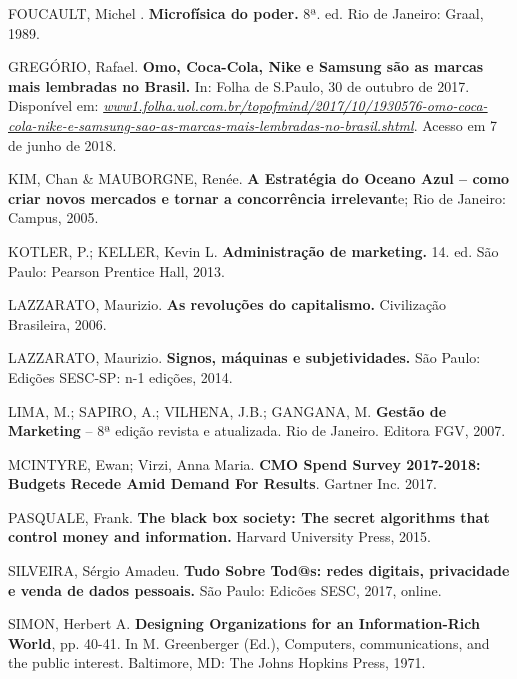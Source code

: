 FOUCAULT, Michel . \textbf{Microfísica do poder.} 8ª. ed. Rio de
Janeiro: Graal, 1989.

GREGÓRIO, Rafael. \textbf{Omo, Coca-Cola, Nike e Samsung são as marcas
mais lembradas no Brasil.} In: Folha de S.Paulo, 30 de outubro de 2017.
Disponível em:
\href{https://www1.folha.uol.com.br/topofmind/2017/10/1930576-omo-coca-cola-nike-e-samsung-sao-as-marcas-mais-lembradas-no-brasil.shtml}{\emph{www1.folha.uol.com.br/topofmind/2017/10/1930576-omo-coca-cola-nike-e-samsung-sao-as-marcas-mais-lembradas-no-brasil.shtml}}.
Acesso em 7 de junho de 2018.

KIM, Chan \& MAUBORGNE, Renée. \textbf{A Estratégia do Oceano Azul --
como criar novos mercados e tornar a concorrência irrelevant}e; Rio de
Janeiro: Campus, 2005.

KOTLER, P.; KELLER, Kevin L. \textbf{Administração de marketing.} 14.
ed. São Paulo: Pearson Prentice Hall, 2013.

LAZZARATO, Maurizio. \textbf{As revoluções do capitalismo.} Civilização
Brasileira, 2006.

LAZZARATO, Maurizio. \textbf{Signos, máquinas e subjetividades.} São
Paulo: Edições SESC-SP: n-1 edições, 2014.

LIMA, M.; SAPIRO, A.; VILHENA, J.B.; GANGANA, M. \textbf{Gestão de
Marketing} -- 8ª edição revista e atualizada. Rio de Janeiro. Editora
FGV, 2007.

MCINTYRE, Ewan; Virzi, Anna Maria. \textbf{CMO Spend Survey 2017-2018:
Budgets Recede Amid Demand For Results}. Gartner Inc. 2017.

PASQUALE, Frank. \textbf{The black box society: The secret algorithms
that control money and information.} Harvard University Press, 2015.

SILVEIRA, Sérgio Amadeu. \textbf{Tudo Sobre Tod@s: redes digitais,
privacidade e venda de dados pessoais.} São Paulo: Edicões SESC, 2017,
online.

SIMON, Herbert A. \textbf{Designing Organizations for an
Information-Rich World}, pp. 40-41. In M. Greenberger (Ed.), Computers,
communications, and the public interest. Baltimore, MD: The Johns
Hopkins Press, 1971.
